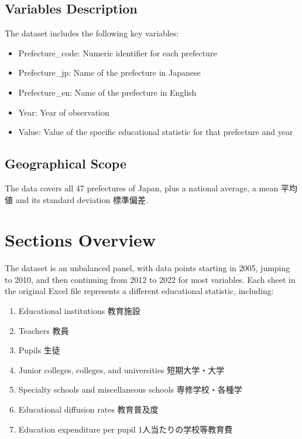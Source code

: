 \documentclass[
  12pt,
  letterpaper,
  DIV=11,
  numbers=noendperiod]{scrartcl}
\providecommand{\tightlist}{%
  \setlength{\itemsep}{0pt}\setlength{\parskip}{0pt}}\usepackage{longtable,booktabs,array}
\begin{document}
\hypertarget{variables-description}{%
\subsection{Variables Description}\label{variables-description}}

The dataset includes the following key variables:

\begin{itemize}
\tightlist
\item
  Prefecture\_code: Numeric identifier for each prefecture
\item
  Prefecture\_jp: Name of the prefecture in Japanese
\item
  Prefecture\_en: Name of the prefecture in English
\item
  Year: Year of observation
\item
  Value: Value of the specific educational statistic for that prefecture
  and year
\end{itemize}

\hypertarget{geographical-scope}{%
\subsection{Geographical Scope}\label{geographical-scope}}

The data covers all 47 prefectures of Japan, plus a national average, a
mean 平均値 and its standard deviation 標準偏差.

\hypertarget{sections-overview}{%
\section{Sections Overview}\label{sections-overview}}

The dataset is an unbalanced panel, with data points starting in 2005,
jumping to 2010, and then continuing from 2012 to 2022 for most
variables. Each sheet in the original Excel file represents a different
educational statistic, including:

\begin{enumerate}
\def\labelenumi{\arabic{enumi}.}
\tightlist
\item
  Educational institutions 教育施設
\item
  Teachers 教員
\item
  Pupils 生徒
\item
  Junior colleges, colleges, and universities 短期大学・大学
\item
  Specialty schools and miscellaneous schools 専修学校・各種学
\item
  Educational diffusion rates 教育普及度
\item
  Education expenditure per pupil 1人当たりの学校等教育費
\end{enumerate}
\end{document}
